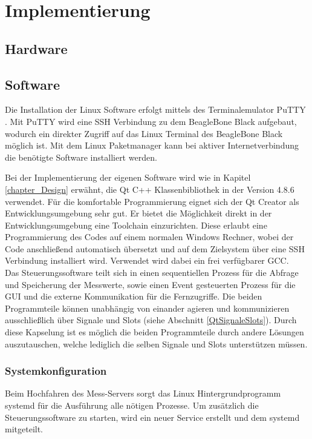 \chapter{Implementierung}
\label{chapter_Implementierung}

\section{Hardware}

\section{Software}

Die Installation der Linux Software erfolgt mittels des Terminalemulator PuTTY \cite{putty}. Mit \mbox{PuTTY} wird eine \ac{SSH} Verbindung zu dem BeagleBone Black aufgebaut, wodurch ein direkter Zugriff auf das Linux Terminal des BeagleBone Black möglich ist. Mit dem Linux Paketmanager kann bei aktiver Internetverbindung die benötigte Software installiert werden.\ 

Bei der Implementierung der eigenen Software wird wie in Kapitel \ref{chapter_Design} erwähnt, die Qt C++ Klassenbibliothek in der Version 4.8.6 verwendet. Für die komfortable Programmierung eignet sich der Qt Creator als Entwicklungsumgebung sehr gut. Er bietet die Möglichkeit direkt in der Entwicklungsumgebung eine Toolchain einzurichten. Diese erlaubt eine Programmierung des Codes auf einem normalen Windows Rechner, wobei der Code anschließend automatisch übersetzt und auf dem Zielsystem über eine \ac{SSH} Verbindung installiert wird. Verwendet wird dabei ein frei verfügbarer \ac{GCC}.\\
Das Steuerungssoftware teilt sich in einen sequentiellen Prozess für die Abfrage und Speicherung der Messwerte, sowie einen Event gesteuerten Prozess für die \ac{GUI} und die externe Kommunikation für die Fernzugriffe. 
Die beiden Programmteile können unabhängig von einander agieren und kommunizieren ausschließlich über Signale und Slots (siehe Abschnitt \ref{QtSignaleSlots}). Durch diese Kapselung ist es möglich die beiden Programmteile durch andere Lösungen auszutauschen, welche lediglich die selben Signale und Slots unterstützen müssen.

\subsection{Systemkonfiguration}

Beim Hochfahren des Mess-Servers sorgt das Linux Hintergrundprogramm systemd für die Ausführung alle nötigen Prozesse. Um zusätzlich die Steuerungssoftware zu starten, wird ein neuer Service erstellt und dem systemd mitgeteilt.\\

